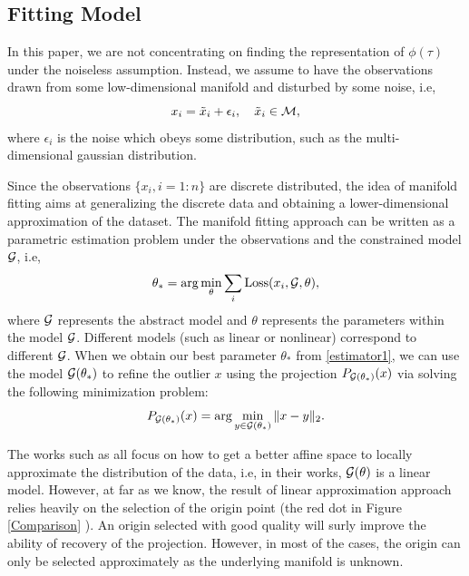 \documentclass{article}
\theoremstyle{remark}
\begin{document}
\subsection{Fitting Model}
In this paper, we are not concentrating on finding the representation of $\phi(\tau)$ under the noiseless assumption. Instead, we assume to have the observations drawn from some low-dimensional manifold and disturbed by some noise, i.e,
\[
x_i = \tilde{x}_i+\epsilon_i, \quad \tilde{x}_i \in \cal M,
\] 
where $\epsilon_i$ is the noise which obeys some distribution, such as the multi-dimensional gaussian distribution.

Since the observations $\{x_i, i=1:n\}$ are discrete distributed, the idea of manifold fitting aims at generalizing the discrete data and obtaining a lower-dimensional approximation of the dataset. The manifold fitting approach can be written as a parametric estimation problem under the observations and the constrained model $\cal G$, i.e,
\begin{equation}\label{estimator1}
 \theta_* =\arg \min_\theta  \sum_i {\rm Loss}(x_i, {\cal G}, \theta ),
\end{equation}
where $\cal G$ represents the abstract model and $\theta$ represents the parameters within the model $\cal G$. Different models (such as linear or nonlinear) correspond to different $\cal G$. When we obtain our best parameter $\theta_*$ from \eqref{estimator1}, we can use the model ${\cal G}(\theta_*)$ to refine the outlier $x$ using the projection $P_{{\cal G}(\theta_*) }(x)$ via solving the following minimization problem:
\[
P_{{\cal G}(\theta_*) }(x) = \arg \min_{y\in {\cal G}(\theta_*) } \|x-y\|_2.
\]
 
The works such as \cite{genovese2014nonparametric,ozertem2011locally} all focus on how to get a better affine space to locally approximate the distribution of the data, i.e, in their works, ${\cal G}(\theta)$ is a linear model. However, at far as we know, the result of linear approximation approach relies heavily on the selection of the origin point (the red dot in Figure \ref{Comparison} ). An origin selected with good quality will surly improve the ability of recovery of the projection. However, in most of the cases, the origin can only be selected approximately as the underlying manifold is unknown.
\end{document}
